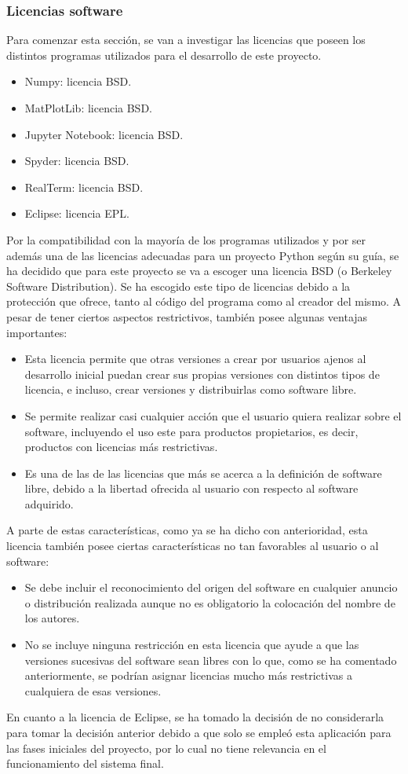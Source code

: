 \subsubsection{Licencias software}
Para comenzar esta sección, se van a investigar las licencias que poseen los distintos programas utilizados para el desarrollo de este proyecto.
\begin{itemize}
	\item Numpy: licencia BSD.
	\item MatPlotLib: licencia BSD.
	\item Jupyter Notebook: licencia BSD.
	\item Spyder: licencia BSD.
	\item RealTerm: licencia BSD.
	\item Eclipse: licencia EPL.
\end{itemize}
Por la compatibilidad con la mayoría de los programas utilizados y por ser además una de las licencias adecuadas para un proyecto Python según su guía, se ha decidido que para este proyecto se va a escoger una licencia BSD (o Berkeley Software Distribution). Se ha escogido este tipo de licencias debido a la protección que ofrece, tanto al código del programa como al creador del mismo. A pesar de tener ciertos aspectos restrictivos, también posee algunas ventajas importantes:
\begin{itemize}
	\item Esta licencia permite que otras versiones a crear por usuarios ajenos al desarrollo inicial puedan crear sus propias versiones con distintos tipos de licencia, e incluso, crear versiones y distribuirlas como software libre.
	\item Se permite realizar casi cualquier acción que el usuario quiera realizar sobre el software, incluyendo el uso este para productos propietarios, es decir, productos con licencias más restrictivas.
	\item Es una de las de las licencias que más se acerca a la definición de software libre, debido a la libertad ofrecida al usuario con respecto al software adquirido.
\end{itemize}
A parte de estas características, como ya se ha dicho con anterioridad, esta licencia también posee ciertas características no tan favorables al usuario o al software:
\begin{itemize}
	\item Se debe incluir el reconocimiento del origen del software en cualquier anuncio o distribución realizada aunque no es obligatorio la colocación del nombre de los autores.
	\item No se incluye ninguna restricción en esta licencia que ayude a que las versiones sucesivas del software sean libres con lo que, como se ha comentado anteriormente, se podrían asignar licencias mucho más restrictivas a cualquiera de esas versiones.
\end{itemize}
En cuanto a la licencia de Eclipse, se ha tomado la decisión de no considerarla para tomar la decisión anterior debido a que solo se empleó esta aplicación para las fases iniciales del proyecto, por lo cual no tiene relevancia en el funcionamiento del sistema final.
